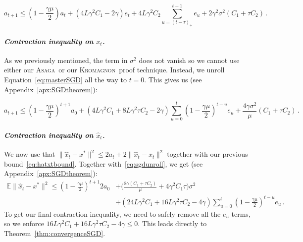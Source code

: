 \documentclass[twoside, 11pt]{article}
\newcommand{\stepsize}{\gamma}
\newcommand{\strongconvex}{\mu}
\newcommand{\overlap}{\tau}
\newcommand{\lipschitz}{L}
\newcommand{\E}{\mathbb{E}}
\newcommand{\ASAGA}{\textsc{Asaga}}
\newcommand{\KROMAGNON}{\textsc{Kromagnon}}
\begin{document}
\begin{equation}\label{eq:masterSGD}
a_{t+1}
\leq (1 - \frac{\stepsize\strongconvex}{2})a_t
+ (4\lipschitz \stepsize^2 C_1 -2\stepsize) e_t
+ 4\lipschitz \stepsize^2 C_2 \sum_{u = (t-\overlap)_+}^{t-1} e_u
+ 2 \stepsize^2 \sigma^2 (C_1 + \overlap C_2)\,.
\end{equation}

\paragraph{\textit{Contraction inequality on $x_t$.}}
As we previously mentioned, the term in $\sigma^2$ does not vanish so we cannot use either our \ASAGA\ or our \KROMAGNON\ proof technique.
Instead, we unroll Equation~\eqref{eq:masterSGD} all the way to $t=0$.
This gives us (see Appendix~\ref{apx:SGDtheorem}):

\begin{equation}\label{eq:sgdunroll}
a_{t+1} \leq (1 - \frac{\stepsize \strongconvex}{2})^{t+1} a_{0}
+ (4\lipschitz \stepsize^2 C_1 + 8\lipschitz \stepsize^2 \overlap C_2 -2\stepsize) \sum_{u=0}^{t} (1 - \frac{\stepsize \strongconvex}{2})^{t -u} e_u
+ \frac{4 \stepsize \sigma^2}{\strongconvex} ( C_1 + \overlap C_2) \,.
\end{equation}

\paragraph{\textit{Contraction inequality on $\hat x_t$.}}
We now use that $\|\hat x_t - x^*\|^2 \leq 2 a_t + 2\|\hat x_t - x_t\|^2$ together with our previous bound~\eqref{eq:hatxtbound}. Together with~\eqref{eq:sgdunroll}, we get (see Appendix~\ref{apx:SGDtheorem}):
\begin{align}\label{eq:sgdxhat}
\E \|\hat x_t - x^*\|^2 \leq
(1 - \frac{\stepsize \strongconvex}{2})^{t+1} 2 a_{0}
&+ \Big(\frac{8 \stepsize (C_1 + \overlap C_2)}{\strongconvex} + 4 \stepsize^2 C_1 \overlap \Big) \sigma^2
\nonumber \\
&+ (24\lipschitz \stepsize^2 C_1 + 16\lipschitz \stepsize^2 \overlap C_2 -4\stepsize) \sum_{u=0}^{t} (1 - \frac{\stepsize \strongconvex}{2})^{t -u} e_u\,.
\end{align}
To get our final contraction inequality, we need to safely remove all the $e_u$ terms, so we enforce $16\lipschitz \stepsize^2 C_1 + 16\lipschitz \stepsize^2 \overlap C_2 -4\stepsize \leq 0$.
This leads directly to Theorem~\ref{thm:convergenceSGD}.
\end{document}
